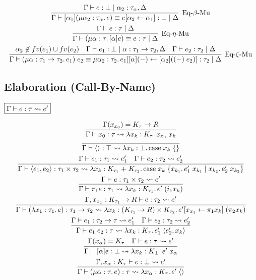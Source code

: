 \begin{gather*}
{  }
  \\
  \infer[\text{Eq-$\beta$-Mu}]{\Gamma \vdash [\alpha_1](\mu \alpha_2: \tau_\alpha\ldotp e) \equiv e[\alpha_2 \assign \alpha_1]: \bot \mid \Delta}{
    \Gamma \vdash e: \bot \mid \alpha_2: \tau_\alpha, \Delta
  }
  \\
  \infer[\text{Eq-$\eta$-Mu}]{\Gamma \vdash (\mu \alpha: \tau\ldotp [\alpha]e) \equiv e: \tau \mid \Delta}{
    \Gamma \vdash e: \tau \mid \Delta
  }
  \\
  \infer[\text{Eq-$\zeta$-Mu}]{\Gamma \vdash (\mu \alpha: \tau_1 \to \tau_2\ldotp e_1)\; e_2 \equiv \mu \alpha_2: \tau_2\ldotp e_1[[\alpha](-) \assign [\alpha_2]((-)\; e_2)]: \tau_2 \mid \Delta}{
    \alpha_2 \not\in \freevar(e_1) \cup \freevar(e_2)
    &
    \Gamma \vdash e_1: \bot \mid \alpha: \tau_1 \to \tau_2, \Delta
    &
    \Gamma \vdash e_2: \tau_2 \mid \Delta
  }
\end{gather*}

\subsection{Elaboration (Call-By-Name)}

$\fbox{$\Gamma \vdash e: \tau \rightsquigarrow e'$}$

\begin{gather*}
  \infer{\Gamma \vdash x_0: \tau \elaborate \lambda x_k: K_\tau\ldotp x_{x_0}\; x_k}{
    \Gamma(x_{x_0}) = K_\tau \to R
  }
  \\
  \infer{\Gamma \vdash \langle\rangle: \top \elaborate \lambda x_k: \bot\ldotp \symcase x_k\; \{\}}{}
  \\
  \infer{\Gamma \vdash \langle e_1, e_2\rangle: \tau_1 \times \tau_2 \elaborate \lambda x_k: K_{\tau_1} \plus K_{\tau_2}\ldotp \symcase x_k\; \{x_{k_1}\ldotp e_1'\; x_{k_1} \mid x_{k_2}\ldotp e_2'\; x_{k_2}\}}{
    \Gamma \vdash e_1: \tau_1 \elaborate e_1'
    &
    \Gamma \vdash e_2: \tau_2 \elaborate e_2'
  }
  \\
  \infer{\Gamma \vdash \pi_1 e: \tau_1 \elaborate \lambda x_k: K_{\tau_1}\ldotp e'\; (i_1 x_k)}{
    \Gamma \vdash e: \tau_1 \times \tau_2 \elaborate e'
  }
  \\
  \infer{\Gamma \vdash (\lambda x_1: \tau_1\ldotp e): \tau_1 \to \tau_2 \elaborate \lambda x_k: (K_{\tau_1} \to R) \times K_{\tau_2}\ldotp e'[x_{x_1} \assign \pi_1 x_k]\; (\pi_2 x_k)}{
    \Gamma, x_{x_1}: K_{\tau_1} \to R \vdash e: \tau_2 \elaborate e'
  }
  \\
  \infer{\Gamma \vdash e_1\; e_2: \tau \elaborate \lambda x_k: K_\tau\ldotp e_1'\; \langle e_2', x_k\rangle}{
    \Gamma \vdash e_1: \tau_2 \to \tau \elaborate e_1'
    &
    \Gamma \vdash e_2: \tau_2 \elaborate e_2'
  }
  \\
  \infer{\Gamma \vdash [\alpha] e: \bot \elaborate \lambda x_k: K_\bot\ldotp e'\; x_\alpha}{
    \Gamma(x_\alpha) = K_\tau
    &
    \Gamma \vdash e: \tau \elaborate e'
  }
  \\
  \infer{\Gamma \vdash (\mu \alpha: \tau\ldotp e): \tau \elaborate \lambda x_\alpha: K_\tau\ldotp e'\; \langle\rangle}{
    \Gamma, x_\alpha: K_\tau \vdash e: \bot \elaborate e'
  }
\end{gather*}

